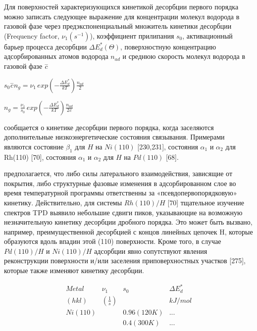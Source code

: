 \documentclass[11pt]{article}
\begin{document}
    Для поверхностей характеризующихся кинетикой десорбции первого порядка
можно записать следующее выражение для концентрации молекул водорода в
газовой фазе через предэкспоненциальный множитель кинетики десорбции
(Frequency factor, \(\nu_{1} (s^{-1})\)), коэффициент прилипания
\(s_0\), активационный барьер процесса десорбции
\(\Delta E^{*}_{d}\left(\Theta\right)\), поверхностную концентрацию
адсорбированных атомов водорода \(n_{ad}\) и среднюю скорость молекул
водорода в газовой фазе \({\overset{-}c}\)

    \(s_0\overset{-}c n_g = \nu_1 \, exp \left(-\frac{\Delta E^{*}_{d}}{kT} \right) \frac{n_{ad}}{2}\)

    \(n_g = \frac{\nu_1}{s_0} \, exp \left(-\frac{\Delta E^{*}_{d}}{kT} \right) \frac{n_{ad}}{2\overset{-}c}\)

    сообщается о кинетике десорбции первого порядка, когда заселяются
дополнительные низкоэнергетические состояния связывания. Примерами
являются состояние \(\beta_1\) для \(H\) на \(Ni(110)\) {[}230,231{]},
состояния \(\alpha_1\) и \(\alpha_2\) для Rh(110) {[}70{]}, состояния
\(\alpha_1\) и \(\alpha_2\) для \(H\) на \(Pd(110)\) {[}68{]}.

предполагается, что либо силы латерального взаимодействия, зависящие от
покрытия, либо структурные фазовые изменения в адсорбированном слое во
время температурной программы ответственны за «псевдопервопорядковую»
кинетику. Действительно, для системы \(Rh(110)/H\) {[}70{]} тщательное
изучение спектров TPD выявило небольшие сдвиги пиков, указывающие на
возможную незначительную кинетику десорбции дробного порядка. Это может
быть вызвано, например, преимущественной десорбцией с концов линейных
цепочек H, которые образуются вдоль впадин этой (110) поверхности. Кроме
того, в случае \(Pd(110)/H\) и \(Ni(110)/H\) адсорбции явно сопутствуют
явления реконструкции поверхности и/или заселения приповерхностных
участков {[}275{]}, которые также изменяют кинетику десорбции.

    \[\begin{array}{rrrr}
Metal      & \nu_{1}                  &    s_0        & \Delta E^{*}_{d} \\
(hkl)      & \left(\frac{1}{s}\right) &               &       kJ/mol     \\
Ni(110)    &                          & 0.96 (120 K)  & ...              \\
           &                          & 0.4  (300 K)  & ...              \\
\end{array}\]
\end{document}
